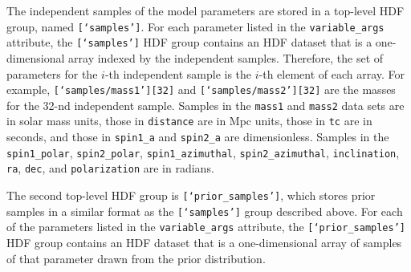 The independent samples of the model parameters are stored in a top-level HDF group, named \texttt{[`samples']}. For each parameter listed in the \texttt{variable\_args} attribute, the \texttt{[`samples']} HDF group contains an HDF dataset that is a one-dimensional array indexed by the independent samples. Therefore, the set of parameters for the $i$-th independent sample is the $i$-th element of each array. For example, \texttt{[`samples/mass1'][32]} and \texttt{[`samples/mass2'][32]} are the masses for the 32-nd independent sample. Samples in the \texttt{mass1} and \texttt{mass2} data sets are in solar mass units, those in \texttt{distance} are in Mpc units, those in \texttt{tc} are in seconds, and those in \texttt{spin1\_a} and \texttt{spin2\_a} are dimensionless. Samples in the \texttt{spin1\_polar}, \texttt{spin2\_polar}, \texttt{spin1\_azimuthal}, \texttt{spin2\_azimuthal}, \texttt{inclination}, \texttt{ra}, \texttt{dec}, and \texttt{polarization} are in radians.


The second top-level HDF group is \texttt{[`prior\_samples']}, which stores prior samples in a similar format as the \texttt{[`samples']} group described above. For each of the parameters listed in the \texttt{variable\_args} attribute, the \texttt{[`prior\_samples']} HDF group contains an HDF dataset that is a one-dimensional array of samples of that parameter drawn from the prior distribution.

